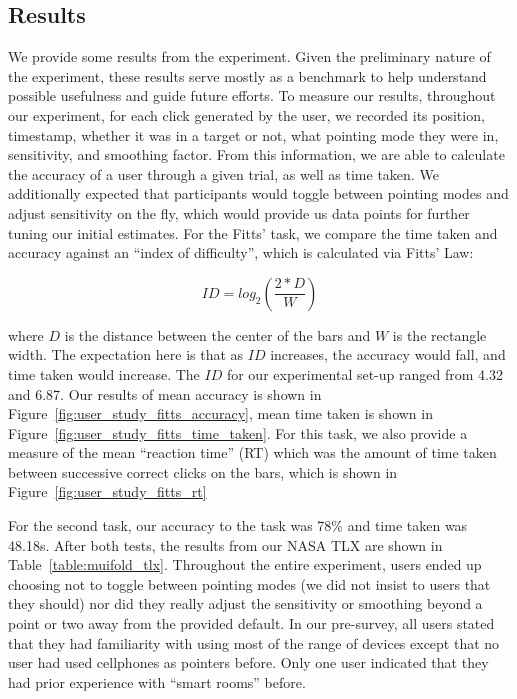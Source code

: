\subsection{Results}

We provide some results from the experiment. Given the preliminary nature
of the experiment, these results serve mostly as a benchmark to help
understand possible usefulness and guide future efforts. To measure our results,
throughout our experiment, for each click generated by the user, we recorded
its position, timestamp, whether it was in a target or not, what pointing
mode they were in, sensitivity, and smoothing factor. From this information, we
are able to calculate the accuracy of a user through a given trial, as well
as time taken. We additionally expected that participants would toggle between
pointing modes and adjust sensitivity on the fly, which would provide us
data points for further tuning our initial estimates. For the Fitts' task,
we compare the time taken and accuracy against an ``index of
difficulty'', which is calculated via Fitts' Law:

\begin{equation}
    ID = log_{2}(\frac{2 * D}{W})
\end{equation}

where $D$ is the distance between the center of the bars and $W$ is the rectangle
width. The expectation here is that as $ID$ increases, the accuracy would fall,
and time taken would increase. The $ID$ for our experimental set-up ranged from
4.32 and 6.87. Our results of mean accuracy is shown in
Figure~\ref{fig:user_study_fitts_accuracy}, mean time taken is shown in
Figure~\ref{fig:user_study_fitts_time_taken}. For this task, we also provide
a measure of the mean ``reaction time'' (RT) which was the amount of time
taken between successive correct clicks on the bars, which is shown in
Figure~\ref{fig:user_study_fitts_rt}

For the second task, our accuracy  to the task was 78\% and time taken was 
48.18s. After both tests, the results from our NASA TLX  are shown in
Table~\ref{table:muifold_tlx}. Throughout the entire experiment, users
ended up choosing not to toggle between pointing modes (we did not insist
to users that they should) nor did they really adjust the sensitivity or
smoothing beyond a point or two away from the provided default. In our
pre-survey, all users stated that they had familiarity with using most of the
range of devices except that no user had used cellphones as pointers before.
Only one user indicated that they had prior experience with ``smart rooms''
before.


